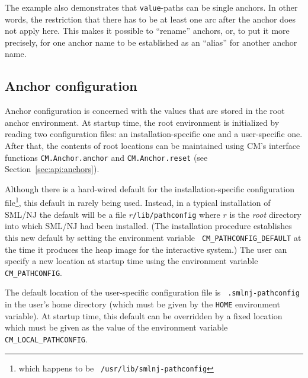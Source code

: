 \documentclass[titlepage,letterpaper]{article}
\begin{document}
The example also demonstrates that {\tt value}-paths can be single
anchors. In other words, the restriction that there has to be at least
one arc after the anchor does not apply here. This makes it possible
to ``rename'' anchors, or, to put it more precisely, for one anchor
name to be established as an ``alias'' for another anchor name.

\subsection{Anchor configuration}
\label{sec:anchor:config}

Anchor configuration is concerned with the values that are stored in
the root anchor environment.  At startup time, the root environment is
initialized by reading two configuration files: an
installation-specific one and a user-specific one.  After that, the
contents of root locations can be maintained using CM's interface
functions {\tt CM.Anchor.anchor} and {\tt CM.Anchor.reset} (see
Section~\ref{sec:api:anchors}).

Although there is a hard-wired default for the installation-specific
configuration file\footnote{which happens to be {\tt
/usr/lib/smlnj-pathconfig}}, this default in rarely being used.
Instead, in a typical installation of SML/NJ the default will be a
file $r${\tt /lib/pathconfig} where $r$ is the {\it root} directory
into which SML/NJ had been installed.  (The installation procedure
establishes this new default by setting the environment variable {\tt
CM\_PATHCONFIG\_DEFAULT} at the time it produces the heap image for
the interactive system.)  The user can specify a new location at
startup time using the environment variable {\tt CM\_PATHCONFIG}.

The default location of the user-specific configuration file is {\tt
.smlnj-pathconfig} in the user's home directory (which must be given
by the {\tt HOME} environment variable).  At startup time, this
default can be overridden by a fixed location which must be given as
the value of the environment variable {\tt CM\_LOCAL\_PATHCONFIG}.
\end{document}
